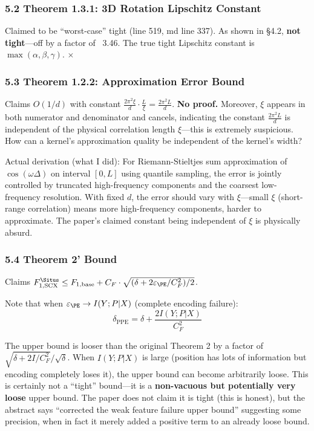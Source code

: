 \documentclass[
  12pt,
]{article}
\begin{document}
\subsubsection{5.2 Theorem 1.3.1: 3D Rotation Lipschitz Constant}\label{theorem-131-not-tight}

Claimed to be ``worst-case'' tight (line 519, md line 337). As shown in \S4.2, \textbf{not tight}---off by a factor of ~3.46. The true tight Lipschitz constant is \(\max(\alpha, \beta, \gamma)\). $\times$

\subsubsection{5.3 Theorem 1.2.2: Approximation Error Bound}\label{theorem-122-approximation}

Claims \(O(1/d)\) with constant \(\frac{2\pi^2\xi}{d} \cdot \frac{L}{\xi} = \frac{2\pi^2 L}{d}\). \textbf{No proof.} Moreover, \(\xi\) appears in both numerator and denominator and cancels, indicating the constant \(\frac{2\pi^2 L}{d}\) is independent of the physical correlation length \(\xi\)---this is extremely suspicious. How can a kernel's approximation quality be independent of the kernel's width?

Actual derivation (what I did): For Riemann-Stieltjes sum approximation of \(\cos(\omega\Delta)\) on interval \([0,L]\) using quantile sampling, the error is jointly controlled by truncated high-frequency components and the coarsest low-frequency resolution. With fixed \(d\), the error should vary with \(\xi\)---small \(\xi\) (short-range correlation) means more high-frequency components, harder to approximate. The paper's claimed constant being independent of \(\xi\) is physically absurd.

\subsubsection{5.4 Theorem 2' Bound}\label{theorem-2-prime-bound}

Claims \(F_{1,\text{SCX}}^{\Situs} \leq F_{1,\text{base}} + C_F \cdot \sqrt{(\delta + 2\varepsilon_{\PE}/C_F^2)/2}\).

Note that when \(\varepsilon_{\PE} \to I(Y;P|X)\) (complete encoding failure):
\[\delta_{\text{PPE}} = \delta + \frac{2I(Y;P|X)}{C_F^2}\]

The upper bound is looser than the original Theorem 2 by a factor of \(\sqrt{\delta + 2I/C_F^2} / \sqrt{\delta}\). When \(I(Y;P|X)\) is large (position has lots of information but encoding completely loses it), the upper bound can become arbitrarily loose. This is certainly not a ``tight'' bound---it is a \textbf{non-vacuous but potentially very loose} upper bound. The paper does not claim it is tight (this is honest), but the abstract says ``corrected the weak feature failure upper bound'' suggesting some precision, when in fact it merely added a positive term to an already loose bound.
\end{document}
